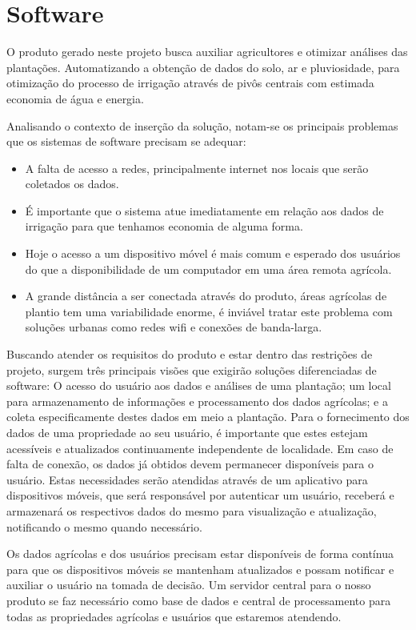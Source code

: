 \chapter[Software]{Software}
O produto gerado neste projeto busca auxiliar agricultores e otimizar análises das plantações. Automatizando a obtenção de dados do solo, ar e pluviosidade, para otimização do processo de irrigação através de pivôs centrais com estimada economia de água e energia.

Analisando o contexto de inserção da solução, notam-se os principais problemas que os sistemas de software precisam se adequar:

\begin{itemize}
\item A falta de acesso a redes, principalmente internet nos locais que serão coletados os dados.
\item É importante que o sistema atue imediatamente em relação aos dados de irrigação para que tenhamos economia de alguma forma.
\item Hoje o acesso a um dispositivo móvel é mais comum e esperado dos usuários do que a disponibilidade de um computador em uma área remota agrícola.
\item A grande distância a ser conectada através do produto, áreas agrícolas de plantio tem uma variabilidade enorme, é inviável tratar este problema com soluções urbanas como redes wifi e conexões de banda-larga.
\end{itemize}

Buscando atender os requisitos do produto e estar dentro das restrições de projeto, surgem três principais visões que exigirão soluções diferenciadas de software: O acesso do usuário aos dados e análises de uma plantação; um local para armazenamento de informações e processamento dos dados agrícolas; e a coleta especificamente destes dados em meio a plantação.
Para o fornecimento dos dados de uma propriedade ao seu usuário, é importante que estes estejam acessíveis e atualizados continuamente independente de localidade. Em caso de falta de conexão, os dados já obtidos devem permanecer disponíveis para o usuário. Estas necessidades serão atendidas através de um aplicativo para dispositivos móveis, que será responsável por autenticar um usuário, receberá e armazenará os respectivos dados do mesmo para visualização e atualização, notificando o mesmo quando necessário.

Os dados agrícolas e dos usuários precisam estar disponíveis de forma contínua para que os dispositivos móveis se mantenham atualizados e possam notificar e auxiliar o usuário na tomada de decisão. Um servidor central para o nosso produto se faz necessário como base de dados e central de processamento para todas as propriedades agrícolas e usuários que estaremos atendendo.

